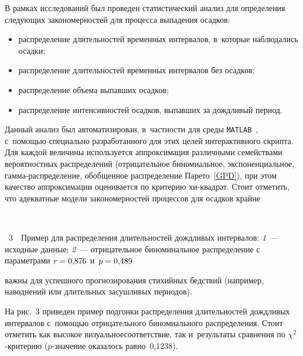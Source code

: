 \begin{multicols}{2}
В рамках исследований был проведен статистический анализ для определения 
следующих закономерностей для процесса выпадения осадков:
\begin{itemize}
\item распределение длительностей временн$\acute{\mbox{ы}}$х интервалов, в~которые наблюдались осадки;
\item распределение длительностей временн$\acute{\mbox{ы}}$х интервалов без осадков;
\item распределение объема выпавших осадков;
\item распределение интенсивностей осадков, выпавших за дождливый период.
\end{itemize}

Данный анализ был автоматизирован, в~част\-ности для 
среды \verb"MATLAB"~\cite{Gorshenin2016Soft3}, с~по\-мощью специально 
разработанного для этих целей интерактивного скрипта. Для каждой величины 
используется аппроксимация различными семействами вероятностных распределений 
(отрицательное биномиальное, экспоненциальное, гамма-распределение, обобщенное 
распределение Парето~\eqref{GPD}), при этом качество аппроксимации оценивается 
по критерию хи-квад\-рат. Стоит отметить, что адекватные модели закономерностей 
процессов для осадков крайне\linebreak\vspace*{-12pt}
{ \begin{center}  %
 \vspace*{1pt}
 \mbox{%
\epsfxsize=77.981mm
}
\end{center}



\noindent
{{\figurename~3}\ \ \small{Пример для распределения длительностей дождливых интервалов:
\textit{1}~--- исходные данные; \textit{2}~--- отрицательное биноминальное 
распределение с параметрами $r\hm=0{,}876$ и~$p\hm= 0{,}489$}}
}


\vspace*{12pt}

\noindent
 важны для успешного прогнозирования стихийных 
бедствий (например, наводнений или длительных засушливых периодов).

На рис.~3 приведен пример подгонки распределения длительностей 
дождливых интервалов с~помощью отрицательного биномиального распределения. 
Стоит отметить как высокое визуальное\linebreak соответствие, так и~результаты сравнения 
по $\chi^2$-кри\-те\-рию ($p$-зна\-че\-ние оказалось равно~0,1238).




\end{multicols}
